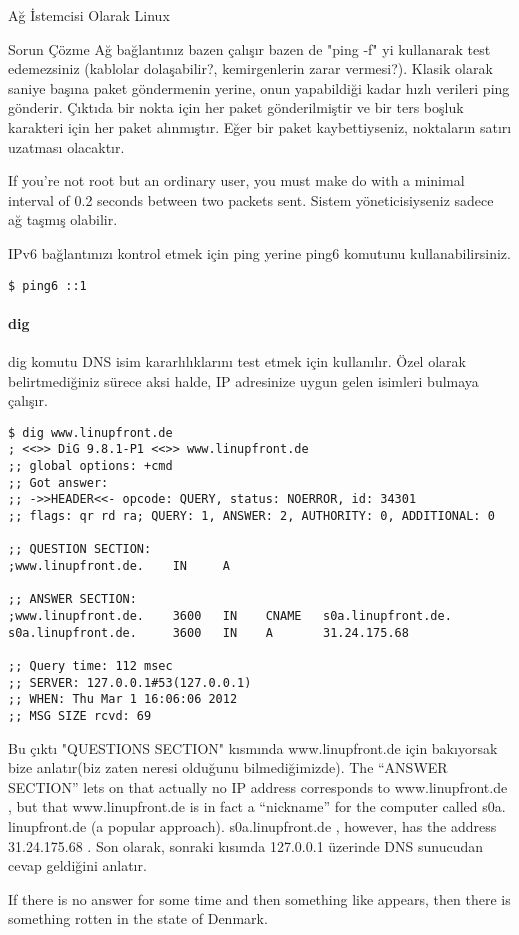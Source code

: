 \begin{section}{Ağ İstemcisi Olarak Linux}
\begin{subsection}{Sorun Çözme}
Ağ bağlantınız bazen çalışır bazen de "ping -f" yi kullanarak test edemezsiniz (kablolar dolaşabilir?, kemirgenlerin zarar vermesi?). Klasik olarak saniye başına paket göndermenin yerine, onun yapabildiği kadar hızlı verileri  ping gönderir. Çıktıda bir nokta için her paket gönderilmiştir ve bir ters boşluk karakteri için her paket alınmıştır. Eğer bir paket kaybettiyseniz, noktaların satırı uzatması olacaktır.

If you’re not root but an ordinary user, you must make do with a minimal interval of 0.2 seconds between two packets sent. Sistem yöneticisiyseniz sadece ağ taşmış olabilir.

IPv6 bağlantınızı kontrol etmek için ping yerine ping6 komutunu kullanabilirsiniz. 
\begin{verbatim}
$ ping6 ::1
\end{verbatim}

\paragraph{dig}{dig komutu DNS isim kararlılıklarını test etmek için kullanılır. Özel olarak belirtmediğiniz sürece aksi halde, IP adresinize uygun gelen isimleri bulmaya çalışır.}
\begin{verbatim}
$ dig www.linupfront.de
; <<>> DiG 9.8.1-P1 <<>> www.linupfront.de
;; global options: +cmd
;; Got answer:
;; ->>HEADER<<- opcode: QUERY, status: NOERROR, id: 34301
;; flags: qr rd ra; QUERY: 1, ANSWER: 2, AUTHORITY: 0, ADDITIONAL: 0

;; QUESTION SECTION:
;www.linupfront.de.    IN     A

;; ANSWER SECTION:
;www.linupfront.de.    3600   IN    CNAME   s0a.linupfront.de.
s0a.linupfront.de.     3600   IN    A       31.24.175.68

;; Query time: 112 msec
;; SERVER: 127.0.0.1#53(127.0.0.1)
;; WHEN: Thu Mar 1 16:06:06 2012
;; MSG SIZE rcvd: 69
\end{verbatim}

Bu çıktı "QUESTIONS SECTION" kısmında www.linupfront.de için bakıyorsak bize anlatır(biz zaten neresi olduğunu bilmediğimizde). The “ANSWER SECTION” lets on that actually no IP address corresponds to www.linupfront.de , but that www.linupfront.de is in fact a “nickname” for the computer called s0a. linupfront.de (a popular approach). s0a.linupfront.de , however, has the address 31.24.175.68 . Son olarak, sonraki kısımda 127.0.0.1 üzerinde DNS sunucudan cevap geldiğini anlatır. 

If there is no answer for some time and then something like appears, then there is something rotten in the state of Denmark.


\end{subsection}
\end{section}
